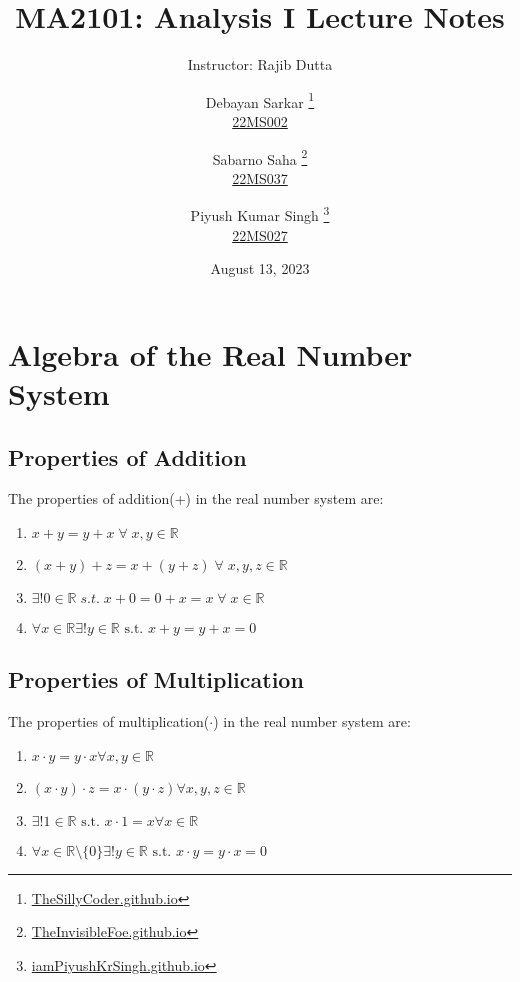 \documentclass{scrartcl}
\newcommand{\rn}{\mathbb{R}}
\begin{document}
    \title{MA2101: Analysis I Lecture Notes}
    \subtitle{Instructor: Rajib Dutta}
    \author{
        Debayan Sarkar
            \thanks{{\href{https://thesillycoder.github.io}{TheSillyCoder.github.io}}}
            \\\href{mailto:ds22ms002@iiserkol.ac.in}{22MS002} \and
        Sabarno Saha
        \thanks{{\href{https://theinvisiblefoe.github.io}{TheInvisibleFoe.github.io}}}
        \\\href{mailto:ss22ms037@iiserkol.ac.in}{22MS037} \and
        Piyush Kumar Singh
            \thanks{{\href{https://iampiyushkrsingh.github.io}{iamPiyushKrSingh.github.io}}}
            \\\href{mailto:pks22ms027@iiserkol.ac.in}{22MS027}
    }
    \date{August 13, 2023}
    \maketitle
    \tableofcontents
    \section{Algebra of the Real Number System}
    \subsection{Properties of Addition}
    The properties of addition(+) in the real number system are:
    \begin{enumerate}[label={(A\arabic*})]
        \item $x+y=y+x\; \forall \; x,y \in \mathbb{R}$
        \item $(x+y)+z = x+(y+z) \; \forall \; x,y,z \in \mathbb{R}$
        \item $ \exists !0 \in \mathbb{R} \; s.t.\; x+0 =0+x =x \; \forall \; x\in \mathbb{R}$
        \item $ \forall x \in \rn \exists! y \in \rn \text{ s.t. } x + y = y + x = 0$
    \end{enumerate}
    \subsection{Properties of Multiplication}
    The properties of multiplication($\cdot$) in the real number system are:
    \begin{enumerate}[label={(M\arabic*)}]
        \item $x\cdot y = y\cdot x \forall x, y \in \rn$ 
        \item $(x \cdot y)\cdot z = x\cdot (y \cdot z) \forall x, y, z \in \rn$
        \item $\exists ! 1 \in \rn \text{ s.t. } x \cdot 1 = x \forall x \in \rn$
        \item $\forall x\in \rn \setminus \{0\} \exists ! y \in \rn \text{ s.t. } x\cdot y = y \cdot x = 0$
    \end{enumerate}
\end{document}
